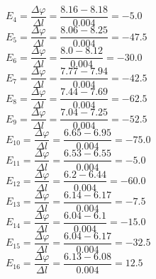 $
E_{4} = 
\dfrac{\varDelta \varphi}{\varDelta l} =
\dfrac{8.16 - 8.18}{0.004} = 
-5.0
$\\


$
E_{5} = 
\dfrac{\varDelta \varphi}{\varDelta l} =
\dfrac{8.06 - 8.25}{0.004} = 
-47.5
$\\


$
E_{6} = 
\dfrac{\varDelta \varphi}{\varDelta l} =
\dfrac{8.0 - 8.12}{0.004} = 
-30.0
$\\


$
E_{7} = 
\dfrac{\varDelta \varphi}{\varDelta l} =
\dfrac{7.77 - 7.94}{0.004} = 
-42.5
$\\


$
E_{8} = 
\dfrac{\varDelta \varphi}{\varDelta l} =
\dfrac{7.44 - 7.69}{0.004} = 
-62.5
$\\


$
E_{9} = 
\dfrac{\varDelta \varphi}{\varDelta l} =
\dfrac{7.04 - 7.25}{0.004} = 
-52.5
$\\


$
E_{10} = 
\dfrac{\varDelta \varphi}{\varDelta l} =
\dfrac{6.65 - 6.95}{0.004} = 
-75.0
$\\


$
E_{11} = 
\dfrac{\varDelta \varphi}{\varDelta l} =
\dfrac{6.53 - 6.55}{0.004} = 
-5.0
$\\


$
E_{12} = 
\dfrac{\varDelta \varphi}{\varDelta l} =
\dfrac{6.2 - 6.44}{0.004} = 
-60.0
$\\


$
E_{13} = 
\dfrac{\varDelta \varphi}{\varDelta l} =
\dfrac{6.14 - 6.17}{0.004} = 
-7.5
$\\


$
E_{14} = 
\dfrac{\varDelta \varphi}{\varDelta l} =
\dfrac{6.04 - 6.1}{0.004} = 
-15.0
$\\


$
E_{15} = 
\dfrac{\varDelta \varphi}{\varDelta l} =
\dfrac{6.04 - 6.17}{0.004} = 
-32.5
$\\


$
E_{16} = 
\dfrac{\varDelta \varphi}{\varDelta l} =
\dfrac{6.13 - 6.08}{0.004} = 
12.5
$\\


